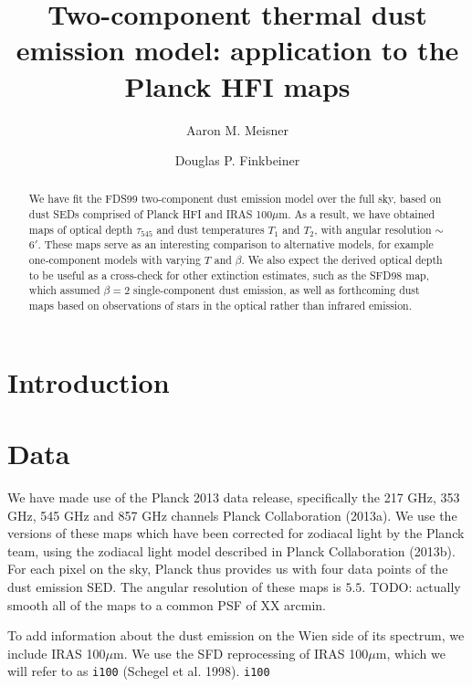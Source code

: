 \documentclass{emulateapj}
\begin{document}
 

\title{Two-component thermal dust emission model: application to the Planck HFI maps}
\author{Aaron M. Meisner}
\author{Douglas P. Finkbeiner}

\begin{abstract}
We have fit the FDS99 two-component dust emission model over
the full sky, based on dust SEDs comprised of  Planck HFI and IRAS 100$\mu$m. 
As a result, we have obtained maps of optical depth $\tau_{545}$ and dust 
temperatures $T_1$ and $T_2$,  with angular resolution  $\sim$6$'$. These maps 
serve as an interesting comparison to alternative models, for example 
one-component models with varying $T$ and $\beta$. We also expect the derived 
optical depth to be useful as a cross-check for other extinction estimates, 
such as the SFD98 map, which assumed $\beta = 2$ single-component dust 
emission, as well as forthcoming dust maps based on observations of stars in 
the optical rather than infrared emission.
\end{abstract}

\section{Introduction}

\section{Data}

We have made use of the Planck 2013 data release, specifically the 217 GHz, 
353 GHz, 545 GHz and 857 GHz channels Planck Collaboration (2013a). We use the 
versions of these maps which have been corrected for zodiacal light by the 
Planck team, using the zodiacal light model described in Planck Collaboration 
(2013b). For each pixel on the sky, Planck thus provides us with four data 
points of the dust emission SED. The angular resolution of these maps is 
$5.5$. TODO: actually smooth all of the maps to a common PSF of XX arcmin.

To add information about the dust emission on the Wien side of its spectrum,
we include IRAS 100$\mu$m. We use the SFD reprocessing of IRAS 100$\mu$m, which
we will refer to as \verb|i100| (Schegel et al. 1998). \verb|i100|
\end{document}
